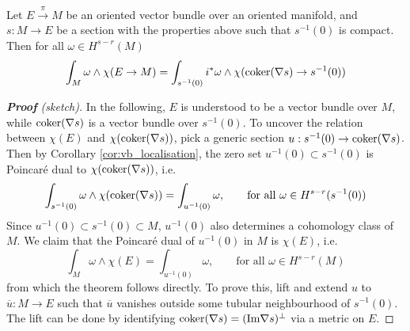 \begin{thm}
	Let $E \xrightarrow{\pi} M$ be an oriented vector bundle over an oriented
	manifold, and  $s : M \to E$ be a section with the properties 
	above such that $s^{-1}(0)$ is compact. Then for all $\omega\in H^{s-r}(M)$
	\[
		\int_M \omega \wedge \chi(E\to M)
		= \int_{s^{-1}(0)} i^*\omega \wedge \chi(\operatorname{coker}(\nabla s)\to s^{-1}(0))
\]
\end{thm}
\begin{proof}[\textbf{\textit{Proof}} (sketch)] %
	In the following, $E$ is understood to be a vector bundle over  $M$, while
	 $\operatorname{coker}(\nabla s)$ is a vector bundle over  $s^{-1}(0)$. 
	To uncover the relation between $\chi(E)$ and  
	$\chi(\operatorname{coker}(\nabla s))$, pick
	a generic section $u : s^{-1}(0) \to \operatorname{coker}(\nabla s)$. Then by Corollary
	\ref{cor:vb_localisation}, the zero set $u^{-1}(0) \subset s^{-1}(0)$ is 
	Poincar\'e dual to  $\chi(\operatorname{coker}(\nabla s))$, i.e. 
	\[
	\int_{s^{-1}(0)} \omega \wedge \chi(\operatorname{coker}(\nabla s)) 
	= \int_{u^{-1}(0)} \omega, \qquad
	\text{for all } \omega\in H^{s-r}(s^{-1}(0))
	\] 
	Since $u^{-1}(0) \subset s^{-1}(0) \subset M$, $u^{-1}(0)$ also determines a
	cohomology class of $M$. We claim that the Poincar\'e dual of $u^{-1}(0)$ in
	$M$ is $\chi(E)$, i.e. 
	\[
	\int_{M} \omega \wedge \chi(E) 
	= \int_{u^{-1}(0)} \omega, \qquad
	\text{for all } \omega\in H^{s-r}(M)
	\] 
	from which the theorem follows directly.
	To prove this, lift and extend $u$ to $\overline{u} : M \to E$
	such that $\overline{u}$ vanishes outside some tubular neighbourhood of
	$s^{-1}(0)$. The lift can be done by identifying $\operatorname{coker}(\nabla s) 
	= ({\operatorname{Im}} \nabla s)^{\perp}$ via a metric on $E$. 


\end{proof}
